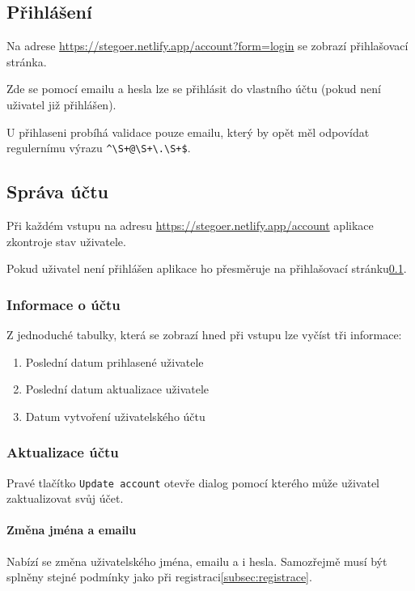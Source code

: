 \subsection{Přihlášení}\label{subsec:prihlaseni}
Na adrese \url{https://stegoer.netlify.app/account?form=login} se zobrazí
přihlašovací stránka.

Zde se pomocí emailu a hesla lze se přihlásit do vlastního účtu (pokud není
uživatel již přihlášen).

U přihlaseni probíhá validace pouze emailu, který by opět měl odpovídat
regulernímu výrazu \verb/^\S+@\S+\.\S+$/.

\subsection{Správa účtu}\label{subsec:sprava-uctu}
Při každém vstupu na adresu \url{https://stegoer.netlify.app/account} aplikace
zkontroje stav uživatele.

Pokud uživatel není přihlášen aplikace ho přesměruje na přihlašovací
stránku\ref{subsec:prihlaseni}.

\subsubsection{Informace o účtu}

Z jednoduché tabulky, která se zobrazí hned při vstupu lze vyčíst tři informace:

\begin{enumerate}
    \item Poslední datum prihlasené uživatele
    \item Poslední datum aktualizace uživatele
    \item Datum vytvoření uživatelského účtu
\end{enumerate}

\subsubsection{Aktualizace účtu}

Pravé tlačítko \texttt{Update account} otevře dialog pomocí kterého může
uživatel zaktualizovat svůj účet.

\paragraph{Změna jména a emailu}

Nabízí se změna uživatelského jména, emailu a i hesla.
Samozřejmě musí být splněny stejné podmínky jako při
registraci\ref{subsec:registrace}.

